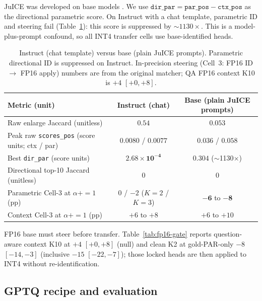 \documentclass{article} %
\begin{document}
JuICE was developed on base models \citep{li2025taming}. We use $\texttt{dir\_par}=\texttt{par\_pos}-\texttt{ctx\_pos}$ as the directional parametric score. On Instruct with a chat template, parametric ID and steering fail (Table~\ref{tab:instruct-base}): this score is suppressed by $\sim 1130\times$. This is a model-plus-prompt confound, so all INT4 transfer cells use base-identified heads.

\begin{table}[t]
\caption{Instruct (chat template) versus base (plain JuICE prompts). Parametric directional ID is suppressed on Instruct. In-precision steering (Cell~3: FP16 ID $\to$ FP16 apply) numbers are from the original matcher; QA FP16 context K10 is $+4$ $[+0,+8]$.}
\label{tab:instruct-base}
\centering
\footnotesize
\setlength{\tabcolsep}{3pt}
\begin{tabular}{p{2.05in}cc}
\toprule
Metric (unit) & Instruct (chat) & Base (plain JuICE prompts) \\
\midrule
Raw enlarge Jaccard (unitless) & $\mathbf{0.54}$ & $\mathbf{0.053}$ \\
Peak raw \texttt{scores\_pos} (score units; ctx / par) & $0.0080$ / $0.0077$ & $\mathbf{0.036}$ / $\mathbf{0.058}$ \\
Best \texttt{dir\_par} (score units) & $\mathbf{2.68\times 10^{-4}}$ & $\mathbf{0.304}$ ($\sim$1130$\times$) \\
Directional top-10 Jaccard (unitless) & $0$ & $0$ \\
Parametric Cell-3 at $\alpha{+}{=}1$ (pp) & $0$ / $-2$ ($K{=}2$ / $K{=}3$) & $\mathbf{-6}$ to $\mathbf{-8}$ \\
Context Cell-3 at $\alpha{+}{=}1$ (pp) & $+6$ to $+8$ & $+6$ to $+10$ \\
\bottomrule
\end{tabular}
\end{table}

FP16 base must steer before transfer. Table~\ref{tab:fp16-gate} reports question-aware context K10 at $+4$ $[+0,+8]$ (null) and clean K2 at gold-PAR-only $-8$ $[-14,-3]$ (inclusive $-15$ $[-22,-7]$); those locked heads are then applied to INT4 without re-identification.

\subsection{GPTQ recipe and evaluation}
\end{document}
